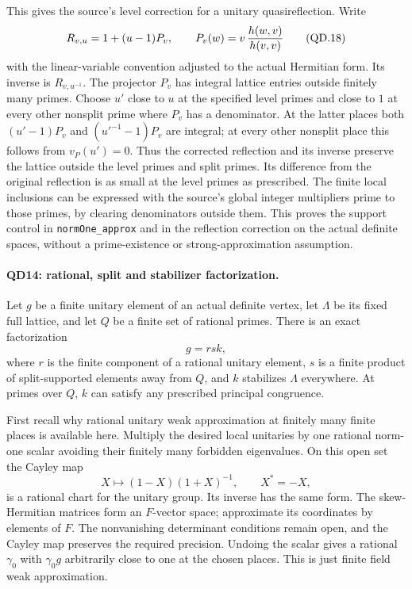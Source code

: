 This gives the source's level correction for a unitary
quasireflection.  Write
\[
 R_{v,u}=1+(u-1)P_v,\qquad
              P_v(w)=v\,{h(w,v)\over h(v,v)}              \tag{QD.18}
\]
with the linear-variable convention adjusted to the actual
Hermitian form.  Its inverse is $R_{v,u^{-1}}$.  The projector
$P_v$ has integral lattice entries outside finitely many primes.
Choose $u'$ close to $u$ at the specified level primes and close
to $1$ at every other nonsplit prime where $P_v$ has a denominator.
At the latter places both $(u'-1)P_v$ and
$(u'^{-1}-1)P_v$ are integral; at every other nonsplit place
this follows from $v_P(u')=0$.  Thus the corrected reflection
and its inverse preserve the lattice outside the level primes
and split primes.  Its difference from the original reflection
is as small at the level primes as prescribed.  The finite
local inclusions can be expressed with the source's global
integer multipliers prime to those primes, by clearing
denominators outside them.  This proves the support control
in \texttt{normOne\_approx} and in the reflection correction
on the actual definite spaces, without a prime-existence or
strong-approximation assumption.

\paragraph{QD14: rational, split and stabilizer factorization.}
Let $g$ be a finite unitary element of an actual definite vertex,
let $\Lambda$ be its fixed full lattice, and let $Q$ be a finite
set of rational primes.  There is an exact factorization
\[
                 g=r s k,                               \tag{QD.19}
\]
where $r$ is the finite component of a rational unitary element,
$s$ is a finite product of split-supported elements away from
$Q$, and $k$ stabilizes $\Lambda$ everywhere.  At primes over
$Q$, $k$ can satisfy any prescribed principal congruence.

First recall why rational unitary weak approximation at finitely
many finite places is available here.  Multiply the desired local
unitaries by one rational norm-one scalar avoiding their finitely
many forbidden eigenvalues.  On this open set the Cayley map
\[
      X\longmapsto(1-X)(1+X)^{-1},\qquad X^*=-X,           \tag{QD.20}
\]
is a rational chart for the unitary group.  Its inverse has the
same form.  The skew-Hermitian matrices form an $F$-vector space;
approximate its coordinates by elements of $F$.  The nonvanishing
determinant conditions remain open, and the Cayley map preserves
the required precision.  Undoing the scalar gives a rational
$\gamma_0$ with $\gamma_0 g$ arbitrarily close to one at the
chosen places.  This is just finite field weak approximation.

